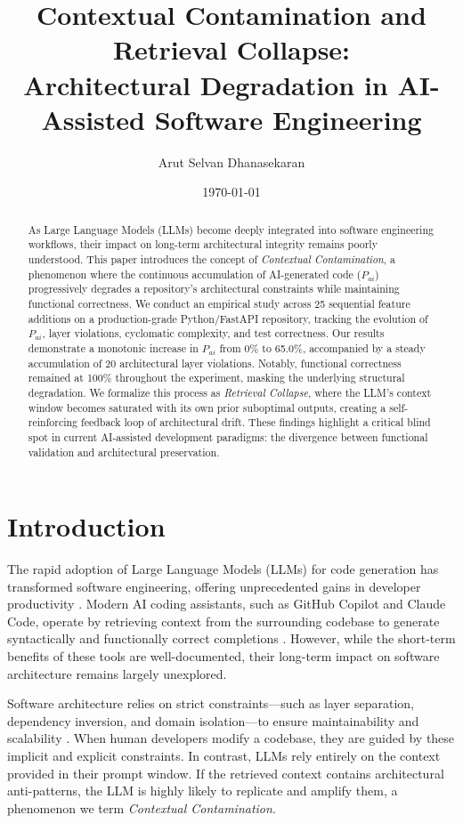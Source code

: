 \documentclass[11pt,a4paper]{article}
\title{\textbf{Contextual Contamination and Retrieval Collapse: \\ Architectural Degradation in AI-Assisted Software Engineering}}
\author{Arut Selvan Dhanasekaran}
\affil{Independent Researcher \\ \texttt{arutselvan710@gmail.com}}
\date{\today}
\begin{document}
\maketitle

\begin{abstract}
As Large Language Models (LLMs) become deeply integrated into software engineering workflows, their impact on long-term architectural integrity remains poorly understood. This paper introduces the concept of \textit{Contextual Contamination}, a phenomenon where the continuous accumulation of AI-generated code ($P_{ai}$) progressively degrades a repository's architectural constraints while maintaining functional correctness. We conduct an empirical study across 25 sequential feature additions on a production-grade Python/FastAPI repository, tracking the evolution of $P_{ai}$, layer violations, cyclomatic complexity, and test correctness. Our results demonstrate a monotonic increase in $P_{ai}$ from 0\% to 65.0\%, accompanied by a steady accumulation of 20 architectural layer violations. Notably, functional correctness remained at 100\% throughout the experiment, masking the underlying structural degradation. We formalize this process as \textit{Retrieval Collapse}, where the LLM's context window becomes saturated with its own prior suboptimal outputs, creating a self-reinforcing feedback loop of architectural drift. These findings highlight a critical blind spot in current AI-assisted development paradigms: the divergence between functional validation and architectural preservation.
\end{abstract}

\section{Introduction}
The rapid adoption of Large Language Models (LLMs) for code generation has transformed software engineering, offering unprecedented gains in developer productivity \citep{peng2023impact, ziegler2022productivity}. Modern AI coding assistants, such as GitHub Copilot and Claude Code, operate by retrieving context from the surrounding codebase to generate syntactically and functionally correct completions \citep{bubeck2024software}. However, while the short-term benefits of these tools are well-documented, their long-term impact on software architecture remains largely unexplored.

Software architecture relies on strict constraints—such as layer separation, dependency inversion, and domain isolation—to ensure maintainability and scalability \citep{martin2017clean}. When human developers modify a codebase, they are guided by these implicit and explicit constraints. In contrast, LLMs rely entirely on the context provided in their prompt window. If the retrieved context contains architectural anti-patterns, the LLM is highly likely to replicate and amplify them, a phenomenon we term \textit{Contextual Contamination}.
\end{document}
